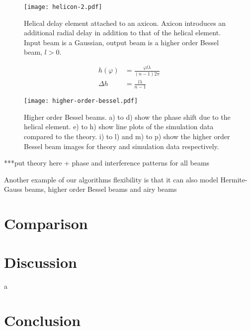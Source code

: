 \begin{figure}[!ht]
    \centering
    \texttt{[image: helicon-2.pdf]}
    \caption{Helical delay element attached to an axicon. Axicon introduces an additional radial delay in addition to that of the helical element. Input beam is a Gaussian, output beam is a higher order Bessel beam, $l>0$.}
    \label{fig:helix-2}
\end{figure}

\begin{align}
h(\varphi) &= \frac{\varphi l\lambda}{(n-1)2\pi}\label{eqn:elemhight}\\
\Delta h   &= \frac{l\lambda}{n-1}
\end{align}


\begin{figure}[!ht]
    \centering
    \texttt{[image: higher-order-bessel.pdf]}
    \caption{Higher order Bessel beams. a) to d) show the phase shift due to the helical element. e) to h) show line plots of the simulation data compared to the theory. i) to l) and m) to p) show the higher order Bessel beam images for theory and simulation data respectively.}
    \label{fig:highordershow}
\end{figure}

 ***put theory here + phase and interference patterns for all beams

Another example of our algorithms flexibility is that it can also model Hermite-Gauss beams, higher order Bessel beams and airy beams

\section{Comparison}

\section{Discussion}


a~\cite{mignon2016fractional}
\section{Conclusion}



